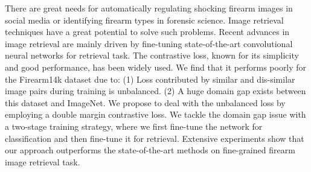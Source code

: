 \begin{enumerate}
There are great needs for automatically regulating shocking firearm images in social media or identifying firearm types in forensic science. Image retrieval techniques have a great potential to solve such problems. Recent advances in image retrieval are mainly driven by fine-tuning state-of-the-art convolutional neural networks for retrieval task. The contrastive loss, known for its simplicity and good performance, has been widely used. We find that it performs poorly for the Firearm14k dataset due to: (1) Loss contributed by similar and dis-similar image pairs during training is unbalanced. (2) A huge domain gap exists between this dataset and ImageNet. We propose to deal with the unbalanced loss by employing a double margin contrastive loss. We tackle the domain gap issue with a two-stage training strategy, where we first fine-tune the network for classification and then fine-tune it for retrieval. Extensive experiments show that our approach outperforms the state-of-the-art methods on fine-grained firearm image retrieval task.

\end{enumerate}
